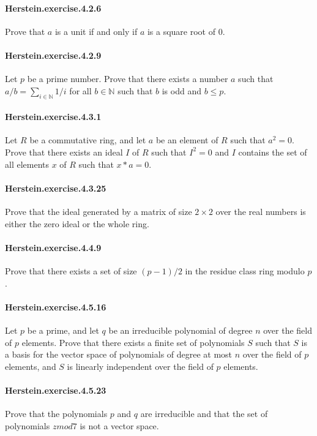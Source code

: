\documentclass{article}
\begin{document}
\paragraph{Herstein.exercise.4.2.6} Prove that $a$ is a unit if and only if $a$ is a square root of $0$.

\paragraph{Herstein.exercise.4.2.9} Let $p$ be a prime number. Prove that there exists a number $a$ such that $a/b = \sum_{i \in \mathbb{N}} 1/i$ for all $b \in \mathbb{N}$ such that $b$ is odd and $b \leq p$.

\paragraph{Herstein.exercise.4.3.1} Let $R$ be a commutative ring, and let $a$ be an element of $R$ such that $a^2=0$. Prove that there exists an ideal $I$ of $R$ such that $I^2=0$ and $I$ contains the set of all elements $x$ of $R$ such that $x*a=0$.

\paragraph{Herstein.exercise.4.3.25} Prove that the ideal generated by a matrix of size $2\times 2$ over the real numbers is either the zero ideal or the whole ring.

\paragraph{Herstein.exercise.4.4.9} Prove that there exists a set of size $(p-1)/2$ in the residue class ring modulo $p$.

\paragraph{Herstein.exercise.4.5.16} Let $p$ be a prime, and let $q$ be an irreducible polynomial of degree $n$ over the field of $p$ elements. Prove that there exists a finite set of polynomials $S$ such that $S$ is a basis for the vector space of polynomials of degree at most $n$ over the field of $p$ elements, and $S$ is linearly independent over the field of $p$ elements.

\paragraph{Herstein.exercise.4.5.23} Prove that the polynomials $p$ and $q$ are irreducible and that the set of polynomials $zmod 7$ is not a vector space.
\end{document}
